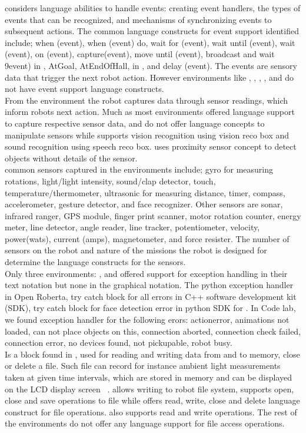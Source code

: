 considers language abilities to handle events: creating event handlers, the types of events that can be recognized, and mechanisms of synchronizing events to subsequent actions. The common language constructs for event support identified include; when (event), when (event) do, wait for (event), wait until (event), wait (event), on (event), capture(event), move until (event), broadcast and wait 9event) in \vex, AtGoal, AtEndOfHall, in \missionlab, and delay (event). The events are sensory data that trigger the next robot action. However environments like \arcbotics, \tivipe, \minibloq, \turtlebot, and \robotc do not have event support language constructs.\\
 From the environment the robot captures data through sensor readings, which inform robots next action. Much as most environments offered language support to capture respective sensor data, \turtlebot and \missionlab do not offer language concepts to manipulate sensors while \choregraphe supports vision recognition using vision reco box and sound recognition using speech reco box. \ozoblockly uses proximity sensor concept to detect objects without details of the sensor.\\
 common sensors captured in the environments include; gyro for measuring rotations, light/light intensity, sound/clap detector, touch, temperature/thermometer, ultrasonic for measuring distance, timer, compass, accelerometer, gesture detector, and face recognizer. Other sensors are sonar, infrared ranger, GPS module, finger print scanner, motor rotation counter, energy meter, line detector, angle reader, line tracker, potentiometer, velocity, power(wats), current (amps), magnetometer, and force resister. The number of sensors on the robot and nature of the missions the robot is designed for determine the language constructs for the sensors.  \\
 Only three environments: \openroberta, \choregraphe and \codelab offered support for exception handling in their text notation but none in the graphical notation. %
 The python exception handler in Open Roberta, try catch block for all errors in C++ software development kit (SDK), try catch block for face detection error in python SDK for \choregraphe. In Code lab, we found exception handler for the following erors: actionerror, animations not loaded, can not place objects on this, connection aborted, connection check failed, connection error, no devices found, not pickupable, robot busy.\\
 Is a block found in \lego, used for reading and writing data from and to memory, close or delete a file. Such file can record for instance ambient light measurements taken at given time intervals, which are stored in memory and can be displayed on the LCD display screen ~\cite{LEGO}. \trik allows writing to robot file system, \choregraphe supports open, close and save operations to file while \missionlab offers read, write, close and delete language construct for file operations. \picaxe also supports read and write operations. The rest of the environments do not offer any language support for file access operations.

